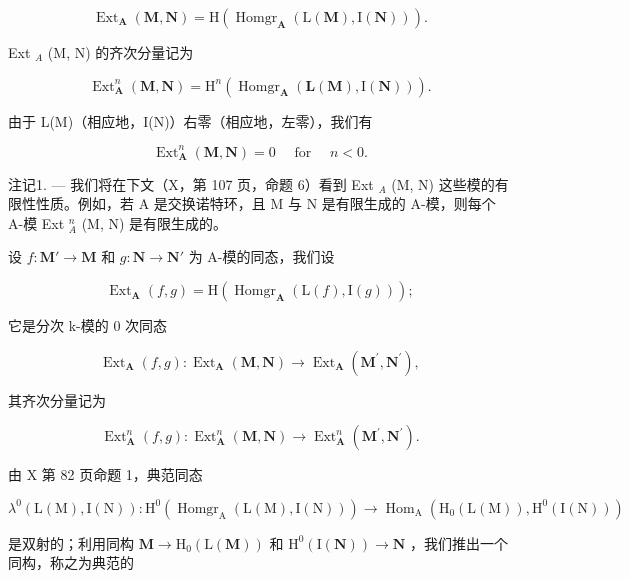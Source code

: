\[
\operatorname{Ext} _ {\mathbf {A}} (\mathbf {M}, \mathbf {N}) = \mathrm{H} \left(\operatorname{Homgr} _ {\mathbf {A}} (\mathrm{L} (\mathbf {M}), \mathrm{I} (\mathbf {N}))\right).\tag{4}
\]

Ext \(_{A}\) (M, N) 的齐次分量记为

\[
\operatorname{Ext} _ {\mathbf {A}} ^ {n} (\mathbf {M}, \mathbf {N}) = \mathrm{H} ^ {n} \left(\operatorname{Homgr} _ {\mathbf {A}} (\mathbf {L} (\mathbf {M}), \mathrm{I} (\mathbf {N}))\right).\tag{5}
\]

由于 L(M)（相应地，I(N)）右零（相应地，左零），我们有

\[
\operatorname{Ext} _ {\mathbf {A}} ^ {n} (\mathbf {M}, \mathbf {N}) = 0 \quad \text { for } \quad n <   0.\tag{6}
\]

注记1. --- 我们将在下文（X，第 107 页，命题 6）看到 Ext \(_{A}\) (M, N) 这些模的有限性性质。例如，若 A 是交换诺特环，且 M 与 N 是有限生成的 A-模，则每个 A-模 Ext \(_{A}^{n}\) (M, N) 是有限生成的。

设 \(f: \mathbf{M}' \to \mathbf{M}\) 和 \(g: \mathbf{N} \to \mathbf{N}'\) 为 A-模的同态，我们设

\[
\operatorname{Ext} _ {\mathbf {A}} (f, g) = \mathrm{H} \left(\operatorname{Homgr} _ {\mathbf {A}} (\mathrm{L} (f), \mathrm{I} (g))\right);
\]

它是分次 k-模的 0 次同态

\[
\operatorname{Ext} _ {\mathbf {A}} (f, g): \operatorname{Ext} _ {\mathbf {A}} (\mathbf {M}, \mathbf {N}) \rightarrow \operatorname{Ext} _ {\mathbf {A}} \left(\mathbf {M} ^ {\prime}, \mathbf {N} ^ {\prime}\right),
\]

其齐次分量记为

\[
\operatorname{Ext} _ {\mathbf {A}} ^ {n} (f, g): \operatorname{Ext} _ {\mathbf {A}} ^ {n} (\mathbf {M}, \mathbf {N}) \rightarrow \operatorname{Ext} _ {\mathbf {A}} ^ {n} \left(\mathbf {M} ^ {\prime}, \mathbf {N} ^ {\prime}\right).
\]

由 X 第 82 页命题 1，典范同态

\[
\lambda^ {0} (\mathrm{L} (\mathrm{M}), \mathrm{I} (\mathrm{N})): \mathrm{H} ^ {0} \left(\operatorname{Homgr} _ {\mathrm{A}} (\mathrm{L} (\mathrm{M}), \mathrm{I} (\mathrm{N}))\right)\rightarrow \operatorname{Hom} _ {\mathrm{A}} \left(\mathrm{H} _ {0} (\mathrm{L} (\mathrm{M})), \mathrm{H} ^ {0} (\mathrm{I} (\mathrm{N}))\right)
\]

是双射的；利用同构 \(\mathbf{M} \to \mathrm{H}_{0}(\mathrm{L}(\mathbf{M}))\) 和 \(\mathrm{H}^{0}(\mathrm{I}(\mathbf{N})) \to \mathbf{N}\) ，我们推出一个同构，称之为典范的

